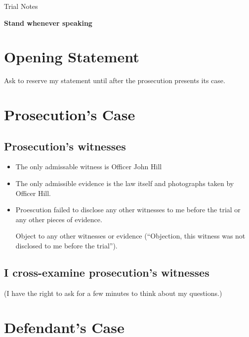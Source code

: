 \documentclass[12pt]{article}
\begin{document}
\begin{center}
{\Huge Trial Notes}
\end{center}

{\bf Stand whenever speaking}


\section{Opening Statement}

Ask to reserve my statement until after the prosecution presents its case.


\section{Prosecution's Case}

\subsection{Prosecution's witnesses}
\begin{itemize}
\item The only admissable witness is Officer John Hill
\item The only admissible evidence is the law itself and photographs taken by Officer Hill.
\item Proescution failed to disclose any other witnesses to me before the trial or any other pieces of evidence.  

Object to any other witnesses or evidence (``Objection,  this witness was not disclosed to me before the trial'').
\end{itemize}

\subsection{I cross-examine prosecution's witnesses}
(I have the right to ask for a few minutes to think about my questions.)


\section{Defendant's Case}
\end{document}
